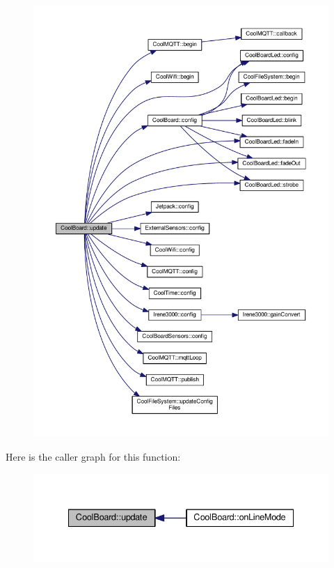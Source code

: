 \begin{figure}[H]
\begin{center}
\leavevmode
\includegraphics[width=350pt]{classCoolBoard_a8612756d3f73198cdde857a66f0fe690_cgraph}
\end{center}
\end{figure}
Here is the caller graph for this function\+:
\nopagebreak
\begin{figure}[H]
\begin{center}
\leavevmode
\includegraphics[width=335pt]{classCoolBoard_a8612756d3f73198cdde857a66f0fe690_icgraph}
\end{center}
\end{figure}
\mbox{\label{classCoolBoard_ae7358fb6e623cfc81b775f5f1734909b}} 
